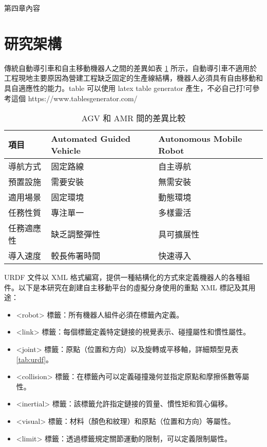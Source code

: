 \allowdisplaybreaks[4]

第四章內容

\section{研究架構}

傳統自動導引車和自主移動機器人之間的差異如表 \ref{tab:compare-agv-amr} 所示，自動導引車不適用於工程現地主要原因為營建工程缺乏固定的生產線結構，機器人必須具有自由移動和具自適應性的能力。table 可以使用 latex table generator 產生，不必自己打!可參考這個 https://www.tablesgenerator.com/

\begin{table}[H]
    \centering
    \caption{AGV 和 AMR 間的差異比較}
    \label{tab:compare-agv-amr}
    \begin{tabular}{lll}
    \hline
    \rowcolor[HTML]{C0C0C0} 
    項目\hspace{1.5cm} & Automated Guided Vehicle & Autonomous Mobile Robot \\ \hline
    導航方式 & 固定路線 & 自主導航 \\
    預置設施 & 需要安裝 & 無需安裝 \\
    適用場景 & 固定環境 & 動態環境 \\ \hline
    任務性質 & 專注單一 & 多樣靈活 \\
    任務適應性 & 缺乏調整彈性 & 具可擴展性 \\
    導入速度 & 較長佈署時間 & 快速導入 \\ \hline
    \end{tabular}
\end{table}

URDF 文件以 XML 格式編寫，提供一種結構化的方式來定義機器人的各種組件。以下是本研究在創建自主移動平台的虛擬分身使用的重點 XML 標記及其用途：

\begin{itemize}
    \item <robot> 標籤：所有機器人組件必須在標籤內定義。
    \item <link> 標籤：每個標籤定義特定鏈接的視覺表示、碰撞屬性和慣性屬性。
    \item <joint> 標籤：原點（位置和方向）以及旋轉或平移軸，詳細類型見表 \ref{tab:urdf}。
    \item <collision> 標籤：在標籤內可以定義碰撞幾何並指定原點和摩擦係數等屬性。
    \item <inertial> 標籤：該標籤允許指定鏈接的質量、慣性矩和質心偏移。
    \item <visual> 標籤：材料（顏色和紋理）和原點（位置和方向）等屬性。
    \item <limit> 標籤：透過標籤規定關節運動的限制，可以定義限制屬性。
\end{itemize}

